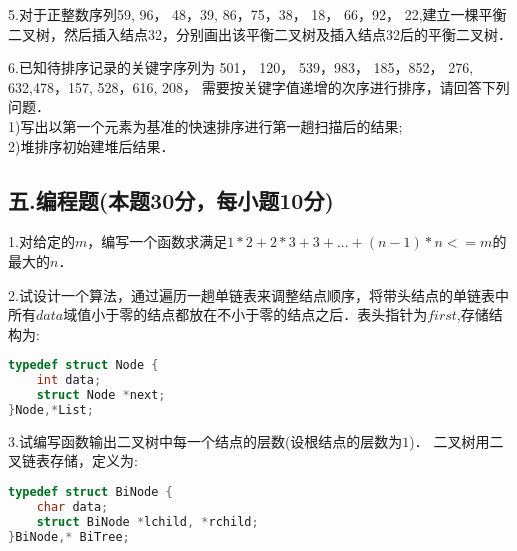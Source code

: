5.对于正整数序列{59, 96， 48，39, 86，75，38， 18， 66，92， 22},建立一棵平衡二叉树，然后插入结点32，分别画出该平衡二叉树及插入结点32后的平衡二叉树．

6.已知待排序记录的关键字序列为{ 501， 120， 539，983， 185，852， 276, 632,478，157, 528，616, 208}， 需要按关键字值递增的次序进行排序，请回答下列问题． \\
1)写出以第一个元素为基准的快速排序进行第一趟扫描后的结果; \\
2)堆排序初始建堆后结果．

\subsection{五.编程题(本题30分，每小题10分)}

1.对给定的$m$，编写一个函数求满足$1*2+2*3+3+...+(n-1)*n<=m$的最大的$n$．

2.试设计一个算法，通过遍历一趟单链表来调整结点顺序，将带头结点的单链表中所有$data$域值小于零的结点都放在不小于零的结点之后．表头指针为$first$,存储结构为:
\begin{lstlisting}[language=cpp]
typedef struct Node {
    int data;
    struct Node *next;
}Node,*List;
\end{lstlisting}

3.试编写函数输出二叉树中每一个结点的层数(设根结点的层数为$1$)． 二叉树用二叉链表存储，定义为:
\begin{lstlisting}[language=cpp]
typedef struct BiNode {
    char data; 
    struct BiNode *lchild, *rchild;
}BiNode,* BiTree;
\end{lstlisting}